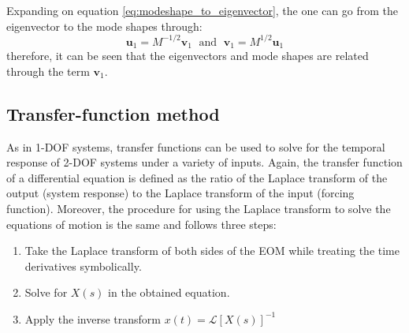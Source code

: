 \documentclass[12pt,letter]{article}
\numberwithin{ex}{section} %
\numberwithin{re}{section} %
\newcommand{\Laplace}[1]{\ensuremath{\mathcal{L}{\left[#1\right]}}}
\begin{document}
Expanding on equation \ref{eq:modeshape_to_eigenvector}, the one can go from the eigenvector to the mode shapes through:
\begin{equation}
\textbf{u}_1 = M^{-1/2}\textbf{v}_1 \; \text{ and } \; \textbf{v}_1 = M^{1/2}\textbf{u}_1
\end{equation}
therefore, it can be seen that the eigenvectors and mode shapes are related through the term $\textbf{v}_1$. 








\subsection{Transfer-function method}

As in 1-DOF systems, transfer functions can be used to solve for the temporal response of 2-DOF systems under a variety of inputs. Again, the transfer function of a differential equation is defined as the ratio of the Laplace transform of the output (system response) to the Laplace transform of the input (forcing function). Moreover, the procedure for using the Laplace transform to solve the equations of motion is the same and follows three steps:
\begin{enumerate}
	\item Take the Laplace transform of both sides of the EOM while treating the time derivatives symbolically.
	\item Solve for $X(s)$ in the obtained equation.
	\item Apply the inverse transform $x(t) = \Laplace{X(s)}^{-1}$
\end{enumerate}
\end{document}
